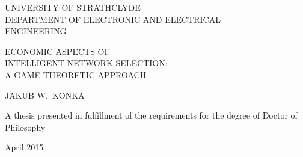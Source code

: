 \begin{titlepage}

{\centering

{\sffamily\Large UNIVERSITY OF STRATHCLYDE}\\
{\sffamily\Large DEPARTMENT OF ELECTRONIC AND ELECTRICAL}\\
{\sffamily\Large ENGINEERING}

\vspace*{3cm}

{\sffamily\Huge ECONOMIC ASPECTS OF}\\
{\sffamily\Huge INTELLIGENT NETWORK SELECTION:}\\
{\sffamily\Huge A GAME-THEORETIC APPROACH}

\vspace{8cm}

{\sffamily\LARGE JAKUB W.~KONKA}

\par
\vspace{3cm}

{\sffamily\Large A thesis presented in fulfillment of the requirements for the degree of Doctor of Philosophy}

\par
\vspace{1cm}

{\sffamily\Large April 2015}

}

\end{titlepage}